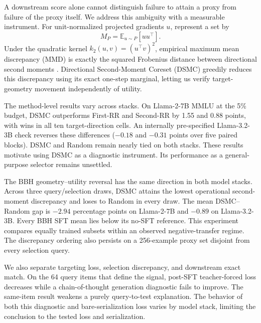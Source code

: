 \documentclass{article}
\newcommand{\method}{\textsc{DSMC}}
\begin{document}
A downstream score alone cannot distinguish failure to attain a proxy from
failure of the proxy itself. We address this ambiguity with a measurable
instrument. For unit-normalized projected gradients $u$, represent a set by
\begin{equation}
    M_P = \mathbb{E}_{u\sim P}[uu^\top].
\end{equation}
Under the quadratic kernel $k_2(u,v)=(u^\top v)^2$, empirical maximum mean
discrepancy (MMD) is exactly the squared Frobenius distance between directional
second moments \citep{gretton2012mmd,muandet2017kme}. Directional Second-Moment
Coreset (\method{}) greedily reduces this discrepancy using its exact one-step
marginal, letting us verify target-geometry movement independently of utility.

The method-level results vary across stacks. On Llama-2-7B MMLU at the 5\%
budget, \method{} outperforms First-RR and Second-RR by 1.55 and 0.88 points,
with wins in all ten target-direction cells. An internally pre-specified
Llama-3.2-3B check reverses these differences ($-0.18$ and $-0.31$ points
over five paired blocks). \method{} and Random remain nearly tied on both
stacks. These results motivate using DSMC as a diagnostic instrument. Its
performance as a general-purpose selector remains unsettled.

The BBH geometry--utility reversal has the same direction in both model
stacks. Across three query/selection draws, \method{} attains the lowest
operational second-moment discrepancy and loses to Random in every draw.
The mean \method{}--Random gap is $-2.94$ percentage points on Llama-2-7B
and $-0.89$ on Llama-3.2-3B. Every BBH SFT mean lies below its no-SFT
reference. This experiment compares equally trained subsets within an observed
negative-transfer regime. The discrepancy ordering also persists on a
256-example proxy set disjoint from every selection query.

We also separate targeting loss, selection discrepancy, and downstream exact
match. On the 64 query items that define the signal, post-SFT teacher-forced
loss decreases while a chain-of-thought generation diagnostic fails to
improve. The same-item result weakens a purely query-to-test explanation.
The behavior of both this diagnostic and bare-serialization loss varies by
model stack, limiting the conclusion to the tested loss and serialization.
\end{document}
